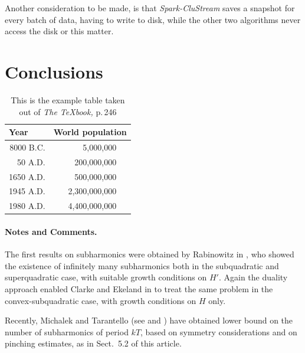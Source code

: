 \documentclass{llncs}
\begin{document}
Another consideration to be made, is that  \textit{Spark-CluStream} saves a snapshot for every batch of data, having to write to disk, while the other two algorithms never access the disk or this matter.



\section{Conclusions}


\begin{table}
\caption{This is the example table taken out of {\it The
\TeX{}book,} p.\,246}
\begin{center}
\begin{tabular}{r@{\quad}rl}
\hline
\multicolumn{1}{l}{\rule{0pt}{12pt}
                   Year}&\multicolumn{2}{l}{World population}\\[2pt]
\hline\rule{0pt}{12pt}
8000 B.C.  &     5,000,000& \\
  50 A.D.  &   200,000,000& \\
1650 A.D.  &   500,000,000& \\
1945 A.D.  & 2,300,000,000& \\
1980 A.D.  & 4,400,000,000& \\[2pt]
\hline
\end{tabular}
\end{center}
\end{table}


\paragraph{Notes and Comments.}
The first results on subharmonics were
obtained by Rabinowitz in \cite{rab}, who showed the existence of
infinitely many subharmonics both in the subquadratic and superquadratic
case, with suitable growth conditions on $H'$. Again the duality
approach enabled Clarke and Ekeland in \cite{clar:eke:2} to treat the
same problem in the convex-subquadratic case, with growth conditions on
$H$ only.

Recently, Michalek and Tarantello (see \cite{mich:tar} and \cite{tar})
have obtained lower bound on the number of subharmonics of period $kT$,
based on symmetry considerations and on pinching estimates, as in
Sect.~5.2 of this article.
\end{document}
